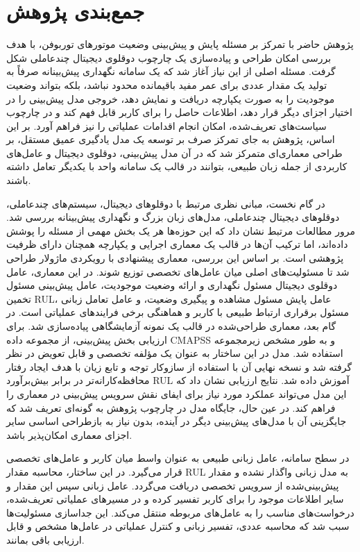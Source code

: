 \section{جمع‌بندی پژوهش}
\label{sec:research-summary}
پژوهش حاضر با تمرکز بر مسئله پایش و پیش‌بینی وضعیت موتورهای توربوفن، با هدف بررسی امکان طراحی و پیاده‌سازی یک چارچوب دوقلوی دیجیتال چندعاملی شکل گرفت. مسئله اصلی از این نیاز آغاز شد که یک سامانه نگهداری پیش‌بینانه صرفاً به تولید یک مقدار عددی برای عمر مفید باقیمانده محدود نباشد، بلکه بتواند وضعیت موجودیت را به صورت یکپارچه دریافت و نمایش دهد، خروجی مدل پیش‌بینی را در اختیار اجزای دیگر قرار دهد، اطلاعات حاصل را برای کاربر قابل فهم کند و در چارچوب سیاست‌های تعریف‌شده، امکان انجام اقدامات عملیاتی را نیز فراهم آورد. بر این اساس، پژوهش به جای تمرکز صرف بر توسعه یک مدل یادگیری عمیق مستقل، بر طراحی معماری‌ای متمرکز شد که در آن مدل پیش‌بینی، دوقلوی دیجیتال و عامل‌های کاربردی از جمله زبان طبیعی، بتوانند در قالب یک سامانه واحد با یکدیگر تعامل داشته باشند.

در گام نخست، مبانی نظری مرتبط با دوقلوهای دیجیتال، سیستم‌های چندعاملی، دوقلوهای دیجیتال چندعاملی، مدل‌های زبان بزرگ و نگهداری پیش‌بینانه بررسی شد. مرور مطالعات مرتبط نشان داد که این حوزه‌ها هر یک بخش مهمی از مسئله را پوشش داده‌اند، اما ترکیب آن‌ها در قالب یک معماری اجرایی و یکپارچه همچنان دارای ظرفیت پژوهشی است. بر اساس این بررسی، معماری پیشنهادی با رویکردی ماژولار طراحی شد تا مسئولیت‌های اصلی میان عامل‌های تخصصی توزیع شوند. در این معماری، عامل دوقلوی دیجیتال مسئول نگهداری و ارائه وضعیت موجودیت، عامل پیش‌بینی مسئول تخمین \gls{RUL}، عامل پایش مسئول مشاهده و پیگیری وضعیت، و عامل تعامل زبانی مسئول برقراری ارتباط طبیعی با کاربر و هماهنگی برخی فرایندهای عملیاتی است.
در گام بعد، معماری طراحی‌شده در قالب یک نمونه آزمایشگاهی پیاده‌سازی شد. برای ارزیابی بخش پیش‌بینی، از مجموعه داده \gls{CMAPSS} و به طور مشخص زیرمجموعه  استفاده شد. مدل  در این ساختار به عنوان یک مؤلفه تخصصی و قابل تعویض در نظر گرفته شد و نسخه نهایی آن با استفاده از سازوکار توجه و تابع زیان  با هدف ایجاد رفتار محافظه‌کارانه‌تر در برابر بیش‌برآورد \gls{RUL} آموزش داده شد. نتایج ارزیابی نشان داد که این مدل می‌تواند عملکرد مورد نیاز برای ایفای نقش سرویس پیش‌بینی در معماری را فراهم کند. در عین حال، جایگاه مدل در چارچوب پژوهش به گونه‌ای تعریف شد که جایگزینی آن با مدل‌های پیش‌بینی دیگر در آینده، بدون نیاز به بازطراحی اساسی سایر اجزای معماری امکان‌پذیر باشد.

در سطح سامانه، عامل زبانی طبیعی به عنوان واسط میان کاربر و عامل‌های تخصصی قرار می‌گیرد. در این ساختار، محاسبه مقدار \gls{RUL} به مدل زبانی واگذار نشده و مقدار پیش‌بینی‌شده از سرویس تخصصی دریافت می‌گردد. عامل زبانی سپس این مقدار و سایر اطلاعات موجود را برای کاربر تفسیر کرده و در مسیرهای عملیاتی تعریف‌شده، درخواست‌های مناسب را به عامل‌های مربوطه منتقل می‌کند. این جداسازی مسئولیت‌ها سبب شد که محاسبه عددی، تفسیر زبانی و کنترل عملیاتی در عامل‌ها مشخص و قابل ارزیابی باقی بمانند.

